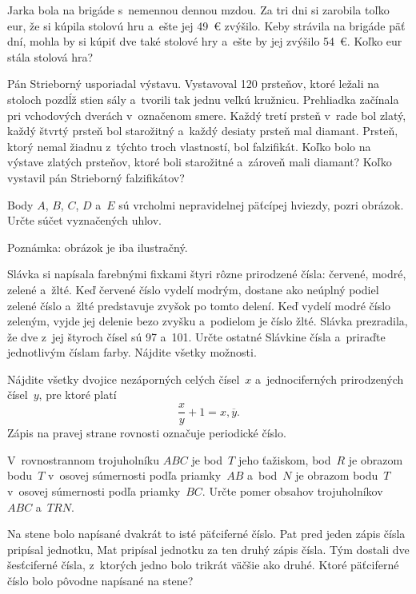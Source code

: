 {%
Jarka bola na brigáde s~nemennou dennou mzdou.
Za tri dni si zarobila toľko eur, že si kúpila stolovú hru a~ešte jej 49~€ zvýšilo.
Keby strávila na brigáde päť dní, mohla by si kúpiť dve také stolové hry a~ešte by jej zvýšilo 54~€.
Koľko eur stála stolová hra?
}

{%
Pán Strieborný usporiadal výstavu.
Vystavoval 120 prsteňov, ktoré ležali na stoloch pozdĺž stien sály a~tvorili tak jednu veľkú kružnicu.
Prehliadka začínala pri vchodových dverách v~označenom smere.
Každý tretí prsteň v~rade bol zlatý, každý štvrtý prsteň bol starožitný a~každý desiaty prsteň mal diamant.
Prsteň, ktorý nemal žiadnu z~týchto troch vlastností, bol falzifikát.
Koľko bolo na výstave zlatých prsteňov, ktoré boli starožitné a~zároveň mali diamant?
Koľko vystavil pán Strieborný falzifikátov?
}

{%
Body $A$, $B$, $C$, $D$ a~$E$ sú vrcholmi nepravidelnej päťcípej hviezdy, pozri obrázok.
Určte súčet vyznačených uhlov.

Poznámka: obrázok je iba ilustračný.
}

{%
Slávka si napísala farebnými fixkami štyri rôzne prirodzené čísla: červené, modré, zelené a~žlté.
Keď červené číslo vydelí modrým, dostane ako neúplný podiel zelené číslo a~žlté predstavuje zvyšok po tomto delení.
Keď vydelí modré číslo zeleným, vyjde jej delenie bezo zvyšku a~podielom je číslo žlté.
Slávka prezradila, že dve z~jej štyroch čísel sú 97 a~101.
Určte ostatné Slávkine čísla a~priraďte jednotlivým číslam farby.
Nájdite všetky možnosti.
}

{%
Nájdite všetky dvojice nezáporných celých čísel~$x$ a~jednociferných prirodzených čísel~$y$, pre ktoré platí
$$
\frac{x}{y}+1=x{,}\overline{y}.
$$
Zápis na pravej strane rovnosti označuje periodické číslo.
}

{%
V~rovnostrannom trojuholníku $ABC$ je bod~$T$ jeho ťažiskom, bod~$R$ je obrazom bodu~$T$ v~osovej súmernosti podľa priamky~$AB$ a~bod~$N$ je obrazom bodu~$T$ v~osovej súmernosti podľa priamky~$BC$.
Určte pomer obsahov trojuholníkov $ABC$ a~$TRN$.
}

{%
Na stene bolo napísané dvakrát to isté päťciferné číslo.
Pat pred jeden zápis čísla pripísal jednotku, Mat pripísal jednotku za ten druhý zápis čísla.
Tým dostali dve šesťciferné čísla, z~ktorých jedno bolo trikrát väčšie ako druhé.
Ktoré päťciferné číslo bolo pôvodne napísané na stene?
}

